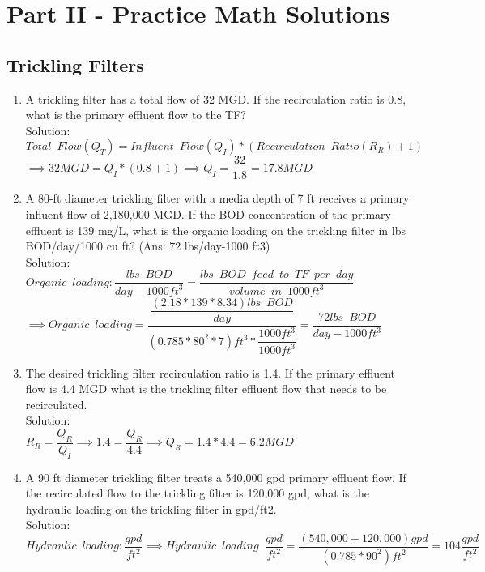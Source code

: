 
\chapter{Part II - Practice Math Solutions}

\section{Trickling Filters}
\begin{enumerate}

\item A trickling filter has a total flow of 32 MGD.  If the recirculation ratio is 0.8, what is the primary effluent flow to the TF?\\
Solution:\\
$Total \enspace Flow (Q_T) = Influent \enspace Flow (Q_I)*(Recirculation \enspace Ratio(R_R) +1)$\\
$\implies 32 MGD=Q_I*(0.8+1)\implies Q_I=\dfrac{32}{1.8}=\boxed{17.8 MGD}$

\item A 80-ft diameter trickling filter with a media depth of 7 ft receives a primary influent flow of 2,180,000 MGD. If the BOD concentration of the primary effluent is 139 mg/L, what is the organic loading on the trickling filter in lbs BOD/day/1000 cu ft? (Ans: 72 lbs/day-1000 ft3)\\
Solution:\\
$Organic \enspace loading:\dfrac{lbs \enspace BOD}{day-1000ft^3}=\dfrac{lbs \enspace BOD \enspace feed \enspace to \enspace TF \enspace per \enspace day}{volume \enspace in \enspace 1000ft^3}$\\
\vspace{0.3cm}
$\implies Organic \enspace loading=\dfrac{\dfrac{(2.18*139*8.34)lbs \enspace BOD}{day}}{(0.785*80^2*7)ft^3*\dfrac{1000ft^3}{1000ft^3}}=\boxed{\dfrac{72 lbs \enspace BOD}{day-1000 ft^3}}$

\item The desired trickling filter recirculation ratio is 1.4.  If the primary effluent flow is 4.4 MGD what is the trickling filter effluent flow that needs to be recirculated.\\
Solution:\\
$R_R=\dfrac{Q_R}{Q_I}\implies 1.4=\dfrac{Q_R}{4.4}\implies Q_R =1.4*4.4=\boxed{6.2 MGD}$\\

\item A 90 ft diameter trickling filter treats a 540,000 gpd primary effluent flow. If the recirculated flow to the trickling filter is 120,000 gpd, what is the hydraulic loading on the trickling filter in gpd/ft2.\\
Solution:\\
$Hydraulic \enspace loading:\dfrac{gpd}{ft^2} \implies Hydraulic \enspace loading \enspace \dfrac{gpd}{ft^2}=\dfrac{(540,000+120,000)gpd}{(0.785*90^2)ft^2} =\boxed{104\dfrac{gpd}{ft^2}}$

\end{enumerate}

